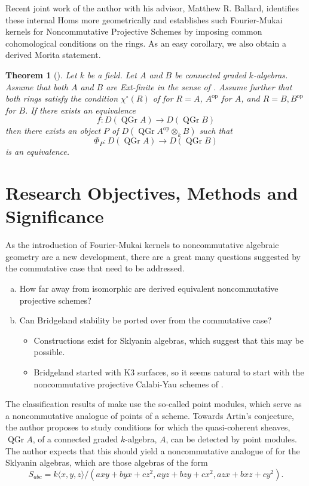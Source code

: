 \documentclass[11pt]{article}
\newtheorem{theorem}{Theorem}[section]
\begin{document}
Recent joint work of the author with his advisor, Matthew R. Ballard, identifies these internal Homs more geometrically and establishes such Fourier-Mukai kernels for Noncommutative Projective Schemes \cite{BF17} by imposing common cohomological conditions on the rings.
As an easy corollary, we also obtain a derived Morita statement.
\begin{theorem}[\cite{BF17}]
  Let $k$ be a field.
  Let $A$ and $B$ be connected graded $k$-algebras.
  Assume that both $A$ and $B$ are Ext-finite in the sense of \cite{BVdB}.
  Assume further that both rings satisfy the condition $\chi^\circ(R)$ of \cite{AZ94} for $R=A$, $A^\text{op}$ for $A$, and $R = B,B^\text{op}$ for $B$.
  If there exists an equivalence
  $$f \colon D(\operatorname{QGr} A) \to D(\operatorname{QGr} B)$$
  then there exists an object $P$ of $D(\operatorname{QGr} A^\text{op} \otimes_k B)$ such that
  $$\Phi_P \colon D(\operatorname{QGr} A) \to D(\operatorname{QGr} B)$$
  is an equivalence.
\end{theorem}

\section{Research Objectives, Methods and Significance}
As the introduction of Fourier-Mukai kernels to noncommutative algebraic geometry are a new development, there are a great many questions suggested by the commutative case that need to be addressed.
\begin{enumerate}[(a)]
\item
  How far away from isomorphic are derived equivalent noncommutative projective schemes?
\item
  Can Bridgeland stability be ported over from the commutative case?
  \begin{itemize}
  \item
    Constructions exist for Sklyanin algebras, which suggest that this may be possible.
  \item
    Bridgeland started with K3 surfaces, so it seems natural to start with the noncommutative projective Calabi-Yau schemes of \cite{kanazawa2015}.
  \end{itemize}
\end{enumerate}
The classification results of \cite{ATV} make use the so-called point modules, which serve as a noncommutative analogue of points of a scheme.
Towards Artin's conjecture, the author proposes to study conditions for which the quasi-coherent sheaves, $\operatorname{QGr} A$, of a connected graded $k$-algebra, $A$, can be detected by point modules.
The author expects that this should yield a noncommutative analogue of \cite{Bondal-Orlov} for the Sklyanin algebras, which are those algebras of the form
$$S_{abc} = k\langle x,y,z \rangle/(axy + byx + cz^2, ayz + bzy + cx^2, azx + bxz + cy^2).$$
\end{document}
